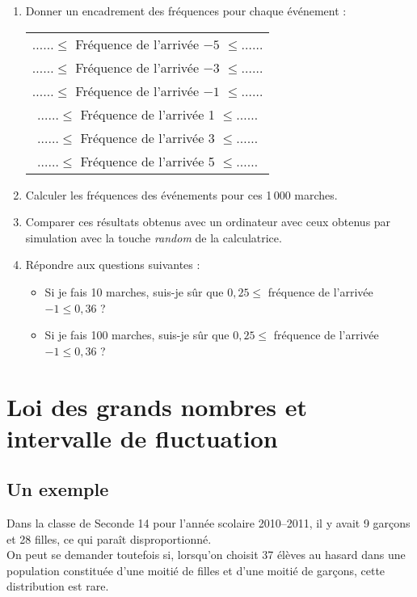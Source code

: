 \begin{act}
\begin{enumerate}
\item Donner un encadrement des fr\'equences pour chaque \'ev\'enement :

\begin{center}
\begin{tabular}
{>{$\ldots\ldots\leq$ Fr\'equence de l'arriv\'ee }c<{ $\leq\ldots\ldots$}}
$-5$ \\ $-3$ \\ $-1$ \\ 1 \\ 3 \\ 5 \\ \end{tabular}
\end{center}

\item Calculer les fr\'equences des \'ev\'enements pour ces 1\,000 marches.
\item Comparer ces r\'esultats obtenus avec un ordinateur avec ceux obtenus par simulation avec la touche \emph{random} de la calculatrice.
\item R\'epondre aux questions suivantes :
\begin{itemize}
	\item Si je fais 10 marches, suis-je sûr que $0,25\leqslant$ fr\'equence de l'arriv\'ee $-1\leqslant 0,36$ ?
	\item Si je fais 100 marches, suis-je sûr que $0,25\leqslant$ fr\'equence de l'arriv\'ee $-1\leqslant 0,36$ ?
\end{itemize}


\end{enumerate}

\end{act}

\sautpage

\section{Loi des grands nombres et intervalle de fluctuation}

\subsection{Un exemple}

 Dans la classe de Seconde 14 pour l'ann\'ee scolaire 2010--2011, il y avait 9 gar\c cons et 28 filles, ce qui para\^it disproportionn\'e.\\
 On peut se demander toutefois si, lorsqu'on choisit 37 \'el\`eves au hasard dans une population constitu\'ee d'une moiti\'e de filles et d'une moiti\'e de gar\c cons, cette distribution est rare.

